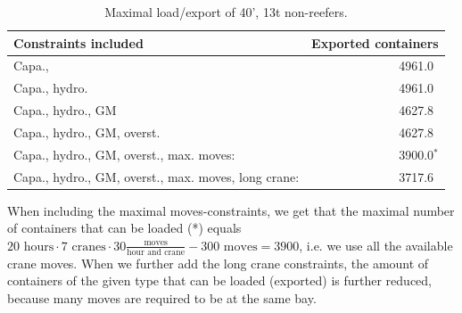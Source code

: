 \begin{table}
\begin{small}
\begin{center}
\begin{tabular}{l|r}
Constraints included						  									&Exported containers\\
\hline
Capa., 																							&4961.0$\phantom{^{*}}$\\
Capa., hydro. 																			&4961.0$\phantom{^{*}}$\\
Capa., hydro., GM																		&4627.8$\phantom{^{*}}$\\
Capa., hydro., GM, overst.													&4627.8$\phantom{^{*}}$\\
Capa., hydro., GM, overst., max. moves:							&3900.0$^{*}$\\ 
Capa., hydro., GM, overst., max. moves, long crane:	&3717.6$\phantom{^{*}}$\\
\end{tabular}
\caption{Maximal load/export of 40', 13t non-reefers.}\label{tab:resultsPS}
\end{center}
\end{small}
\end{table}

When including the maximal moves-constraints, we get that the maximal number of containers that can be loaded (*) equals $20\text{ hours}\cdot7\text{ cranes}\cdot 30 \frac{\text{moves}}{\text{hour and crane}} - 300 \text{ moves} = 3900$, i.e. we use all the available crane moves.  
When we further add the long crane constraints, the amount of containers of the given type that can be loaded (exported) is further reduced, because many moves are required to be at the same bay.


